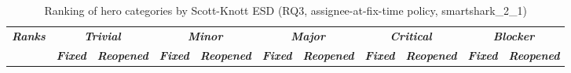\begin{table}[htbp]
    \centering
    \scriptsize
    \caption{Ranking of hero categories by Scott-Knott ESD (RQ3, assignee-at-fix-time policy, smartshark\_2\_1)}
    \label{tab:rq3-herorank-assignee-at-fix-time}
    \begin{adjustbox}{max width=\textwidth}
        \begin{tabular}{|c|cc|cc|cc|cc|cc|}
            \hline
            \multirow{2}{*}{\textit{\textbf{Ranks}}} & \multicolumn{2}{c|}{\textit{\textbf{Trivial}}} & \multicolumn{2}{c|}{\textit{\textbf{Minor}}} & \multicolumn{2}{c|}{\textit{\textbf{Major}}} & \multicolumn{2}{c|}{\textit{\textbf{Critical}}} & \multicolumn{2}{c|}{\textit{\textbf{Blocker}}} \\ \cline{2-11}
            & \multicolumn{1}{c|}{\textit{\textbf{Fixed}}} & \textit{\textbf{Reopened}} & \multicolumn{1}{c|}{\textit{\textbf{Fixed}}} & \textit{\textbf{Reopened}} & \multicolumn{1}{c|}{\textit{\textbf{Fixed}}} & \textit{\textbf{Reopened}} & \multicolumn{1}{c|}{\textit{\textbf{Fixed}}} & \textit{\textbf{Reopened}} & \multicolumn{1}{c|}{\textit{\textbf{Fixed}}} & \textit{\textbf{Reopened}} \\ \hline

\end{tabular}
\end{adjustbox}
\end{table}
